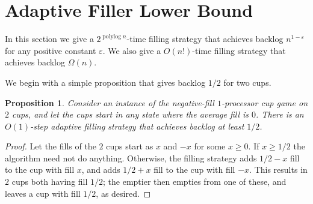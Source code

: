 \documentclass[twocolumn]{article}[10pt]
\DeclareMathOperator{\polylog}{\text{polylog}}
\DeclareMathOperator{\fil}{\text{fill}}
\newtheorem{proposition}{Proposition}
\begin{document}
\section{Adaptive Filler Lower Bound}\label{sec:adaptive}

In this section we give a $2^{\polylog n}$-time filling strategy
that achieves backlog $n^{1 - \varepsilon}$ for any positive
constant $\varepsilon$. 
We also give a $O(n!)$-time filling strategy that achieves
backlog $\Omega(n)$.

We begin with a simple proposition that gives backlog $1/2$ for two cups.
\begin{proposition}
  \label{prop:adaptiveBase}
  Consider an instance of the negative-fill $1$-processor cup
  game on $2$ cups, and let the cups start in any state where the
  average fill is $0$. There is an $O(1)$-step adaptive filling
  strategy that achieves backlog at least $1/2$.
\end{proposition}
\begin{proof}
  Let the fills of the $2$ cups start as $x$ and $-x$ for some $x\ge
  0$. If $x\ge 1/2$ the algorithm need not do anything. Otherwise, the filling
  strategy adds $1/2 - x$ fill to the cup with fill $x$, and adds
  $1/2 + x$ fill to the cup with fill $-x$. This results in $2$
  cups both having fill $1/2$; the emptier then empties from one
  of these, and leaves a cup with fill $1/2$, as desired.
\end{proof}

  
\end{document}
